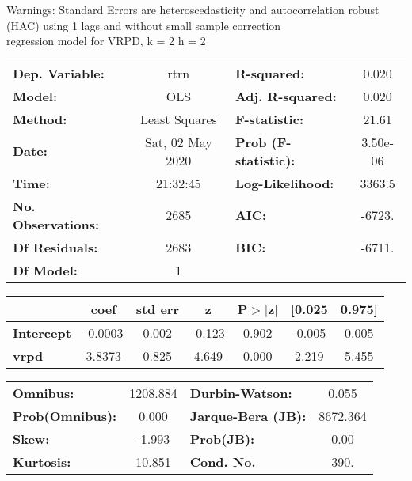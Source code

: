 Warnings: \newline
 [1] Standard Errors are heteroscedasticity and autocorrelation robust (HAC) using 1 lags and without small sample correction\\ 

regression model for VRPD, k = 2 h = 2\begin{center}
\begin{tabular}{lclc}
\toprule
\textbf{Dep. Variable:}    &       rtrn       & \textbf{  R-squared:         } &     0.020   \\
\textbf{Model:}            &       OLS        & \textbf{  Adj. R-squared:    } &     0.020   \\
\textbf{Method:}           &  Least Squares   & \textbf{  F-statistic:       } &     21.61   \\
\textbf{Date:}             & Sat, 02 May 2020 & \textbf{  Prob (F-statistic):} &  3.50e-06   \\
\textbf{Time:}             &     21:32:45     & \textbf{  Log-Likelihood:    } &    3363.5   \\
\textbf{No. Observations:} &        2685      & \textbf{  AIC:               } &    -6723.   \\
\textbf{Df Residuals:}     &        2683      & \textbf{  BIC:               } &    -6711.   \\
\textbf{Df Model:}         &           1      & \textbf{                     } &             \\
\bottomrule
\end{tabular}
\begin{tabular}{lcccccc}
                   & \textbf{coef} & \textbf{std err} & \textbf{z} & \textbf{P$> |$z$|$} & \textbf{[0.025} & \textbf{0.975]}  \\
\midrule
\textbf{Intercept} &      -0.0003  &        0.002     &    -0.123  &         0.902        &       -0.005    &        0.005     \\
\textbf{vrpd}      &       3.8373  &        0.825     &     4.649  &         0.000        &        2.219    &        5.455     \\
\bottomrule
\end{tabular}
\begin{tabular}{lclc}
\textbf{Omnibus:}       & 1208.884 & \textbf{  Durbin-Watson:     } &    0.055  \\
\textbf{Prob(Omnibus):} &   0.000  & \textbf{  Jarque-Bera (JB):  } & 8672.364  \\
\textbf{Skew:}          &  -1.993  & \textbf{  Prob(JB):          } &     0.00  \\
\textbf{Kurtosis:}      &  10.851  & \textbf{  Cond. No.          } &     390.  \\
\bottomrule
\end{tabular}
\end{center}

